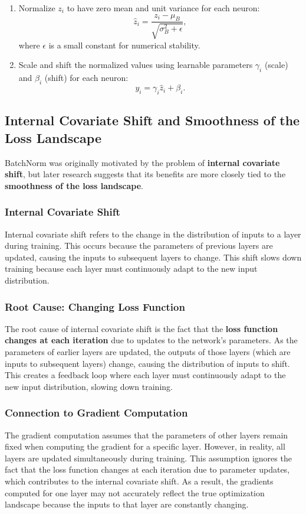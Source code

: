 \begin{notechapter}
\begin{enumerate}[leftmargin=*]
    \item Normalize \(z_i\) to have zero mean and unit variance for each neuron:
    \[
    \hat{z}_i = \frac{z_i - \mu_B}{\sqrt{\sigma_B^2 + \epsilon}},
    \]
    where \(\epsilon\) is a small constant for numerical stability.

    \item Scale and shift the normalized values using learnable parameters
    \(\gamma_i\) (scale) and \(\beta_i\) (shift) for each neuron:
    \[
    y_i = \gamma_i \hat{z}_i + \beta_i.
    \]
\end{enumerate}

\subsection{Internal Covariate Shift and Smoothness of the Loss Landscape}
BatchNorm was originally motivated by the problem of \textbf{internal covariate shift},
but later research suggests that its benefits are more closely tied to the
\textbf{smoothness of the loss landscape}.

\subsubsection{Internal Covariate Shift}
Internal covariate shift refers to the change in the distribution of
inputs to a layer during training. This occurs because the parameters
of previous layers are updated, causing the inputs to subsequent layers
to change. This shift slows down training because each layer must
continuously adapt to the new input distribution.

\subsubsection{Root Cause: Changing Loss Function}
The root cause of internal covariate shift is the fact that the \textbf{loss function changes at each iteration} due to updates to the network's parameters. As the parameters of earlier layers are updated, the outputs of those layers (which are inputs to subsequent layers) change, causing the distribution of inputs to shift. This creates a feedback loop where each layer must continuously adapt to the new input distribution, slowing down training.

\subsubsection{Connection to Gradient Computation}
The gradient computation assumes that the parameters of other layers remain fixed when computing the gradient for a specific layer. However, in reality, all layers are updated simultaneously during training. This assumption ignores the fact that the loss function changes at each iteration due to parameter updates, which contributes to the internal covariate shift. As a result, the gradients computed for one layer may not accurately reflect the true optimization landscape because the inputs to that layer are constantly changing.


\end{notechapter}
